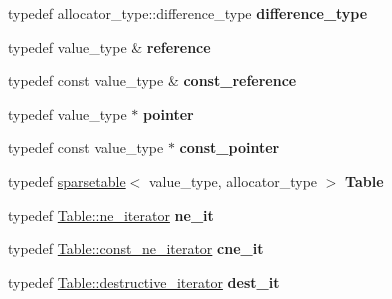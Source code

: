 \begin{DoxyCompactItemize}
\item 
typedef allocator\+\_\+type\+::difference\+\_\+type {\bfseries difference\+\_\+type}\hypertarget{classspp___1_1sparse__hashtable_a52ce21cba2586f3cc4ea0c1fd4c96e33}{}\label{classspp___1_1sparse__hashtable_a52ce21cba2586f3cc4ea0c1fd4c96e33}

\item 
typedef value\+\_\+type \& {\bfseries reference}\hypertarget{classspp___1_1sparse__hashtable_ac87bb089206f8d229362fbb70ea14166}{}\label{classspp___1_1sparse__hashtable_ac87bb089206f8d229362fbb70ea14166}

\item 
typedef const value\+\_\+type \& {\bfseries const\+\_\+reference}\hypertarget{classspp___1_1sparse__hashtable_a0335b991176ffe550c446b00320745bd}{}\label{classspp___1_1sparse__hashtable_a0335b991176ffe550c446b00320745bd}

\item 
typedef value\+\_\+type $\ast$ {\bfseries pointer}\hypertarget{classspp___1_1sparse__hashtable_aeb08cf55b2632151a0aa77ee35c58e4d}{}\label{classspp___1_1sparse__hashtable_aeb08cf55b2632151a0aa77ee35c58e4d}

\item 
typedef const value\+\_\+type $\ast$ {\bfseries const\+\_\+pointer}\hypertarget{classspp___1_1sparse__hashtable_acf93b553d5d94e8b62e20118f31673b2}{}\label{classspp___1_1sparse__hashtable_acf93b553d5d94e8b62e20118f31673b2}

\item 
typedef \hyperlink{classspp___1_1sparsetable}{sparsetable}$<$ value\+\_\+type, allocator\+\_\+type $>$ {\bfseries Table}\hypertarget{classspp___1_1sparse__hashtable_a0e12e130f58dcb26ca670f84b9b13b70}{}\label{classspp___1_1sparse__hashtable_a0e12e130f58dcb26ca670f84b9b13b70}

\item 
typedef \hyperlink{classspp___1_1_two__d__iterator}{Table\+::ne\+\_\+iterator} {\bfseries ne\+\_\+it}\hypertarget{classspp___1_1sparse__hashtable_a9c11ba8842156425be3eef5cf0aa268c}{}\label{classspp___1_1sparse__hashtable_a9c11ba8842156425be3eef5cf0aa268c}

\item 
typedef \hyperlink{classspp___1_1_two__d__iterator}{Table\+::const\+\_\+ne\+\_\+iterator} {\bfseries cne\+\_\+it}\hypertarget{classspp___1_1sparse__hashtable_af3ca19ad9b8fe854c5f31e9d5c73c1d6}{}\label{classspp___1_1sparse__hashtable_af3ca19ad9b8fe854c5f31e9d5c73c1d6}

\item 
typedef \hyperlink{classspp___1_1_two__d__destructive__iterator}{Table\+::destructive\+\_\+iterator} {\bfseries dest\+\_\+it}\hypertarget{classspp___1_1sparse__hashtable_a3fcf6bd79b508f55f46b4038b47f1e29}{}\label{classspp___1_1sparse__hashtable_a3fcf6bd79b508f55f46b4038b47f1e29}


\end{DoxyCompactItemize}
